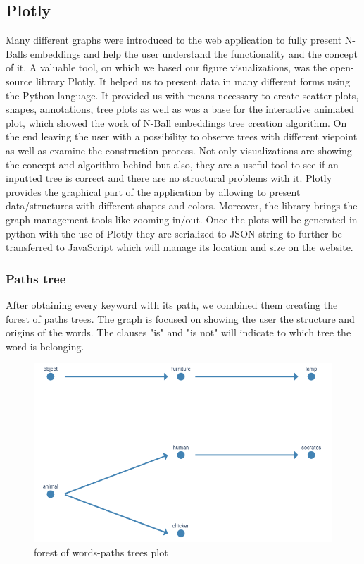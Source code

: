 \documentclass[]{article}
\begin{document}
\subsection{Plotly} \label{plotly}
Many different graphs were introduced to the web application to fully present N-Balls embeddings and help the user understand the functionality and the concept of it. A valuable tool, on which we based our figure visualizations, was the open-source library Plotly. It helped us to present data in many different forms using the Python language. It provided us with means necessary to create scatter plots, shapes, annotations, tree plots as well as was a base for the interactive animated plot, which showed the work of N-Ball embeddings tree creation algorithm. On the end leaving the user with a possibility to observe trees with different viepoint as well as examine the construction process. Not only visualizations are showing the concept and algorithm behind but also, they are a useful tool to see if an inputted tree is correct and there are no structural problems with it. Plotly provides the graphical part of the application by allowing to present data/structures with different shapes and colors. Moreover, the library brings the graph management tools like zooming in/out. Once the plots will be generated in python with the use of Plotly they are serialized to JSON string to further be transferred to JavaScript which will manage its location and size on the website. 


\subsubsection{Paths tree}
After obtaining every keyword with its path, we combined them creating the forest of paths trees. The graph is focused on showing the user the structure and origins of the words. The clauses "is" and "is not" will indicate to which tree the word is belonging.


\begin{figure}[H]
	\includegraphics[width=\textwidth]{res/tree_forest.png}
	\caption{forest of words-paths trees plot}
	\label{fig:tree_forest}
\end{figure}
\end{document}

